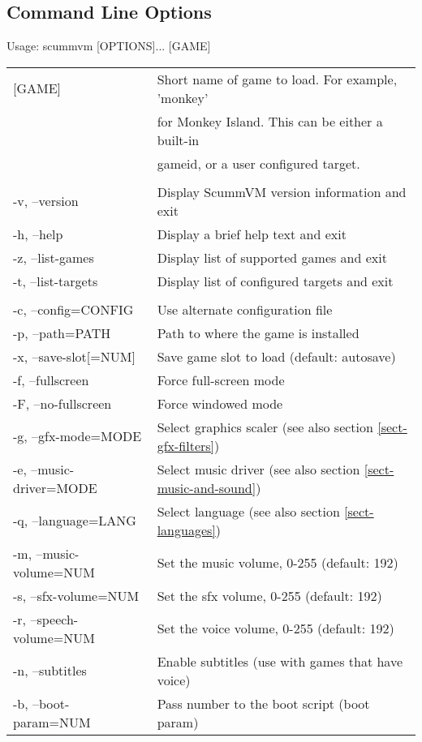 \subsection{Command Line Options}

Usage: scummvm [OPTIONS]... [GAME]\\
\begin{tabular}{ll}
  [GAME]                  &Short name of game to load. For example, 'monkey'\\
                          &for Monkey Island. This can be either a built-in\\
                          &gameid, or a user configured target.\\
\\
  -v, --version           &Display ScummVM version information and exit\\
  -h, --help              &Display a brief help text and exit\\
  -z, --list-games        &Display list of supported games and exit\\
  -t, --list-targets      &Display list of configured targets and exit\\
\\
  -c, --config=CONFIG     &Use alternate configuration file\\
  -p, --path=PATH         &Path to where the game is installed\\
  -x, --save-slot[=NUM]   &Save game slot to load (default: autosave)\\
  -f, --fullscreen        &Force full-screen mode\\
  -F, --no-fullscreen     &Force windowed mode\\
  -g, --gfx-mode=MODE     &Select graphics scaler (see also section \ref{sect-gfx-filters})\\
  -e, --music-driver=MODE &Select music driver (see also section \ref{sect-music-and-sound})\\
  -q, --language=LANG     &Select language (see also section \ref{sect-languages})\\
  -m, --music-volume=NUM  &Set the music volume, 0-255 (default: 192)\\
  -s, --sfx-volume=NUM    &Set the sfx volume, 0-255 (default: 192)\\
  -r, --speech-volume=NUM  &Set the voice volume, 0-255 (default: 192)\\
  -n, --subtitles         &Enable subtitles (use with games that have voice)\\
  -b, --boot-param=NUM    &Pass number to the boot script (boot param)\\

\end{tabular}
